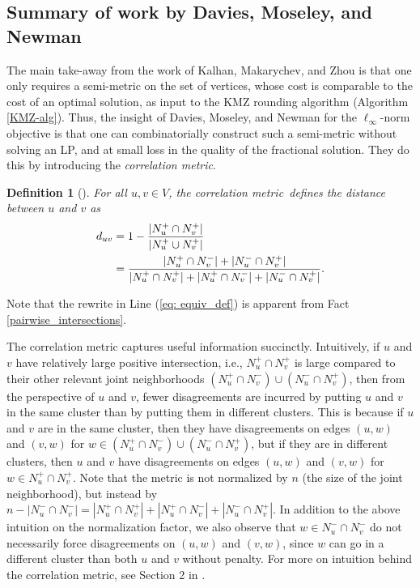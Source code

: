 \documentclass[11pt]{article}
\newtheorem{definition}{Definition}
\newcommand{\dn}{correlation metric}
\begin{document}
\subsection{Summary of work by Davies, Moseley, and Newman}\label{sec: DMN-summary}


The main take-away from the work of Kalhan, Makarychev, and Zhou \citeyearpar{KMZ19} is that one only requires a semi-metric on the set of vertices,
whose cost is comparable to the cost of an optimal solution,
as input to the KMZ rounding algorithm (Algorithm \ref{KMZ-alg}). 
Thus, the insight of Davies, Moseley, and Newman \citeyearpar{DMN23} for the $\ell_{\infty}$-norm objective is that one can combinatorially construct such a semi-metric without solving an LP, and at small loss in the quality of the fractional solution.
They do this by introducing the \emph{correlation metric}.


\begin{definition}[\cite{DMN23}] \label{def: orig_corr_metric}
For all $u,v \in V$, the \textit{\dn}~defines the 
distance between $u$ and $v$ as
\begin{align}
 \label{eq: equiv_def}
d_{uv} &= 1-\frac{|N_u^+ \cap N_v^+|}{|N_u^+ \cup N_v^+|} \notag \\
&=  \frac{|N_u^+ \cap N_v^-| +|N_u^- \cap N_v^+| }{|N_u^+ \cap N_v^+| + |N_u^+ \cap N_v^-| + |N_u^- \cap N_v^+|}.
\end{align}
\end{definition}

Note that the rewrite in Line (\ref{eq: equiv_def}) is apparent from Fact \ref{pairwise_intersections}.


The correlation metric captures useful information  succinctly.
Intuitively, if $u$ and $v$ have relatively large positive intersection, i.e., $N_u^+ \cap N_v^+$ is large compared to their other relevant joint neighborhoods $\left (N_u^+ \cap N_v^-\right ) \cup \left ( N_u^- \cap N_v^+\right )$, then from the perspective of $u$ and $v$,
fewer disagreements are incurred by putting
$u$ and $v$ in the same cluster than by putting them in different clusters.
This is because if $u$ and $v$ are in the same cluster, then they have disagreements on edges $(u,w)$ and $(v,w)$ for $w \in \left (N_u^+ \cap N_v^- \right )\cup \left (N_u^- \cap N_v^+\right )$, but if they are in different clusters, then $u$ and $v$ have disagreements on edges $(u,w)$ and $(v,w)$ for  $w \in N_u^+ \cap N_v^+$. 
Note that the metric is not normalized by $n$ (the size of the joint neighborhood), but instead by $n-| N_u^- \cap N_v^- | = |N_u^+ \cap N_v^+| + |N_u^+ \cap N_v^-| + |N_u^- \cap N_v^+|$.
In addition to the above intuition on the normalization factor, we also observe that $w \in N_u^- \cap N_v^- $ do not necessarily force disagreements on $(u,w)$ and $(v,w)$, since $w$ can go in a different cluster than both $u$ and $v$ without penalty.
For more on intuition behind the correlation metric, see Section 2 in \cite{DMN23}.
\end{document}
